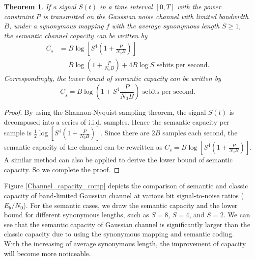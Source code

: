 \documentclass[12pt, draftclsnofoot,onecolumn]{IEEEtran}
\newtheorem{theorem}{\bf{Theorem}}
\begin{document}
\begin{theorem}
If a signal $S(t)$ in a time interval $[0,T]$ with the power constraint $P$ is transmitted on the Gaussian noise channel with limited bandwidth $B$, under a synonymous mapping $f$ with the average synonymous length $S\geq 1$, the semantic channel capacity can be written by
\begin{equation}
\begin{aligned}
C_s&=B\log\left[S^4\left(1+\frac{P}{N_0B}\right)\right] \\
      &=B\log \left(1+\frac{P}{N_0B}\right)+4B\log S  \text{ sebits per second.}
\end{aligned}
\end{equation}
Correspondingly, the lower bound of semantic capacity can be written by
\begin{equation}
\underline{C}_s=B\log \left(1+S^4\frac{P}{N_0B}\right)  \text{ sebits per second.}
\end{equation}
\end{theorem}
\begin{proof}
By using the Shannon-Nyquist sampling theorem, the signal $S(t)$ is decomposed into a series of i.i.d. samples. Hence the semantic capacity per sample is $\frac{1}{2}\log\left[S^4\left(1+\frac{P}{N_0B}\right)\right]$. Since there are $2B$ samples each second, the semantic capacity of the channel can be rewritten as $C_s=B\log\left[S^4\left(1+\frac{P}{N_0B}\right)\right]$. A similar method can also be applied to derive the lower bound of semantic capacity. So we complete the proof.
\end{proof}

Figure \ref{Channel_capacity_comp} depicts the comparison of semantic and classic capacity of band-limited Gaussian channel at various bit signal-to-noise ratios ($E_b/N_0$). For the semantic cases, we draw the semantic capacity and the lower bound for different synonymous lengths, such as $S=8$, $S=4$, and $S=2$. We can see that the semantic capacity of Gaussian channel is significantly larger than the classic capacity due to using the synonymous mapping and semantic coding. With the increasing of average synonymous length, the improvement of capacity will become more noticeable.
\end{document}
